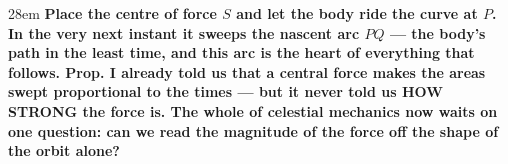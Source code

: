 \documentclass[border=4pt]{standalone}
\begin{document}
\begin{varwidth}{28em}
\large\bfseries
Place the centre of force $S$ and let the body ride the curve at $P$. In the very next      instant it sweeps the nascent arc $PQ$ — the body's path in the least time, and this arc is the      heart of everything that follows. Prop. I already told us that a central force makes the areas swept      proportional to the times — but it never told us HOW STRONG the force is. The whole of celestial      mechanics now waits on one question: can we read the magnitude of the force off the shape of the orbit alone?
\end{varwidth}
\end{document}
